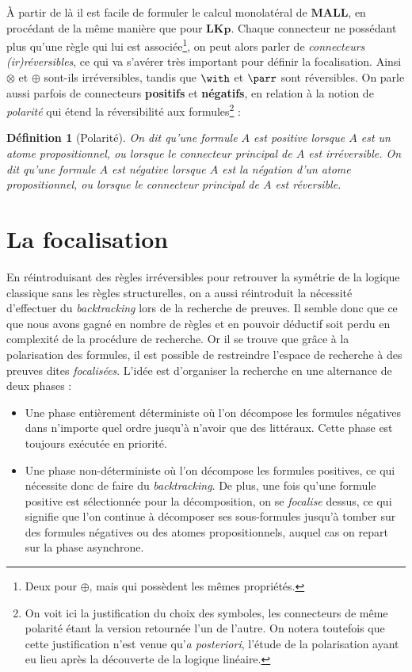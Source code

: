 \documentclass[12pt]{report}
\newtheorem{definition}{Définition}
\begin{document}
À partir de là il est facile de formuler le calcul monolatéral de $\mathbf{MALL}$, en procédant de la même manière que pour $\mathbf{LKp}$. Chaque connecteur ne possédant plus qu'une règle qui lui est associée\footnote{Deux pour $\oplus$, mais qui possèdent les mêmes propriétés.}, on peut alors parler de \emph{connecteurs (ir)réversibles}, ce qui va s'avérer très important pour définir la focalisation. Ainsi $\otimes$ et $\oplus$ sont-ils irréversibles, tandis que $\with$ et $\parr$ sont réversibles. On parle aussi parfois de connecteurs \textbf{positifs} et \textbf{négatifs}, en relation à la notion de \emph{polarité} qui étend la réversibilité aux formules\footnote{On voit ici la justification du choix des symboles, les connecteurs de même polarité étant la version retournée l'un de l'autre. On notera toutefois que cette justification n'est venue qu'\textit{a posteriori}, l'étude de la polarisation ayant eu lieu après la découverte de la logique linéaire.} :

\begin{definition}[Polarité]
	On dit qu'une formule $A$ est \emph{positive} lorsque $A$ est un atome propositionnel, ou lorsque le connecteur principal de $A$ est irréversible.
	On dit qu'une formule $A$ est \emph{négative} lorsque $A$ est la négation d'un atome propositionnel, ou lorsque le connecteur principal de $A$ est réversible.
\end{definition}

\section{La focalisation}

En réintroduisant des règles irréversibles pour retrouver la symétrie de la logique classique sans les règles structurelles, on a aussi réintroduit la nécessité d'effectuer du \textit{backtracking} lors de la recherche de preuves. Il semble donc que ce que nous avons gagné en nombre de règles et en pouvoir déductif soit perdu en complexité de la procédure de recherche. Or il se trouve que grâce à la polarisation des formules, il est possible de restreindre l'espace de recherche à des preuves dites \emph{focalisées}. L'idée est d'organiser la recherche en une alternance de deux phases :
\begin{itemize}
	\item Une phase entièrement déterministe où l'on décompose les formules négatives dans n'importe quel ordre jusqu'à n'avoir que des littéraux. Cette phase est toujours exécutée en priorité.
	\item Une phase non-déterministe où l'on décompose les formules positives, ce qui nécessite donc de faire du \textit{backtracking}. De plus, une fois qu'une formule positive est sélectionnée pour la décomposition, on se \emph{focalise} dessus, ce qui signifie que l'on continue à décomposer ses sous-formules jusqu'à tomber sur des formules négatives ou des atomes propositionnels, auquel cas on repart sur la phase asynchrone.
\end{itemize}
\end{document}
